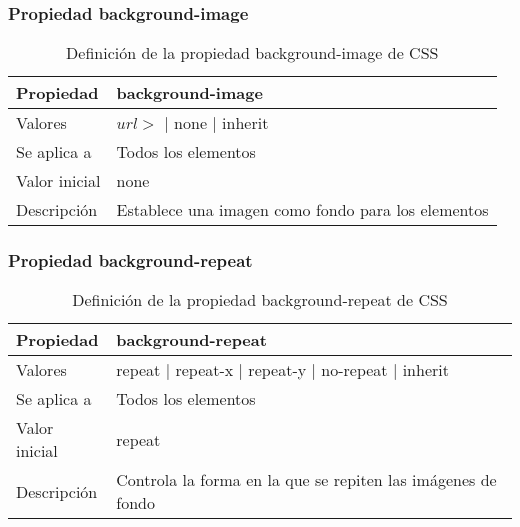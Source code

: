 \begin{frame}
\frametitle{Propiedad background-image}

\begin{center}
  \begin{table}
   \begin{tabular}{p{1.8cm}p{7.8cm}}
Propiedad & \bf{background-image} \\ \hline
Valores& $url>$ | none | inherit \\ \hline
Se aplica a& Todos los elementos \\ \hline
Valor inicial& none \\ \hline
Descripción& Establece una imagen como fondo para los elementos \\ \hline
  \end{tabular}
   \caption{Definición de la propiedad background-image de CSS}
 \end{table}
\end{center}


\end{frame}



\begin{frame}
\frametitle{Propiedad background-repeat}

\begin{center}
  \begin{table}
   \begin{tabular}{p{1.8cm}p{7.8cm}}
Propiedad & \bf{background-repeat} \\ \hline
Valores& repeat | repeat-x | repeat-y | no-repeat | inherit \\ \hline
Se aplica a& Todos los elementos \\ \hline
Valor inicial& repeat \\ \hline
Descripción& Controla la forma en la que se repiten las imágenes de fondo \\ \hline
  \end{tabular}
   \caption{Definición de la propiedad background-repeat de CSS}
 \end{table}
\end{center}


\end{frame}



